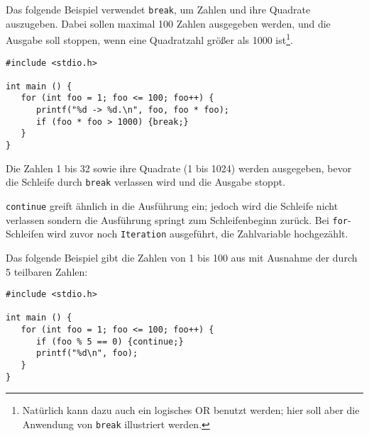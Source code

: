 Das folgende Beispiel verwendet \texttt{break}, um Zahlen und ihre Quadrate auszugeben. Dabei sollen maximal 100 Zahlen ausgegeben werden, und die Ausgabe soll stoppen, wenn eine Quadratzahl größer als 1000 ist\footnote{Natürlich kann dazu auch ein logisches OR benutzt werden; hier soll aber die Anwendung von \texttt{break} illustriert werden.}.

\begin{codebox}
\begin{verbatim}
#include <stdio.h>

int main () {
   for (int foo = 1; foo <= 100; foo++) {
      printf("%d -> %d.\n", foo, foo * foo);
      if (foo * foo > 1000) {break;}
   }
}
\end{verbatim}
\end{codebox}

Die Zahlen 1 bis 32 sowie ihre Quadrate (1 bis 1024) werden ausgegeben, bevor die Schleife durch  \texttt{break} verlassen wird und die Ausgabe stoppt.

\texttt{continue} greift ähnlich in die Ausführung ein; jedoch wird die Schleife nicht verlassen sondern die Ausführung springt zum Schleifenbeginn zurück. Bei \texttt{for}-Schleifen wird zuvor noch \texttt{Iteration} ausgeführt, \ie \eg die Zahlvariable hochgezählt.

Das folgende Beispiel gibt die Zahlen von 1 bis 100 aus mit Ausnahme der durch 5 teilbaren Zahlen:

\begin{codebox}
\begin{verbatim}
#include <stdio.h>

int main () {
   for (int foo = 1; foo <= 100; foo++) {
      if (foo % 5 == 0) {continue;}
      printf("%d\n", foo);
   }
}
\end{verbatim}
\end{codebox}